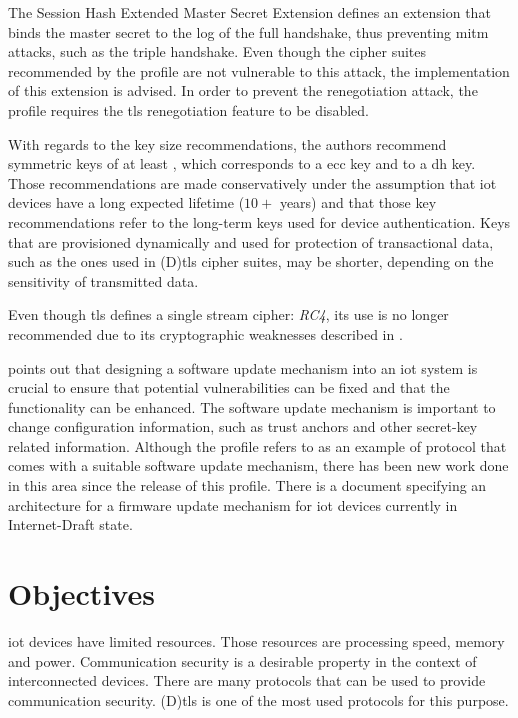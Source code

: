 \documentclass{llncs}
\begin{document}
The Session Hash Extended Master Secret Extension\cite{RFC7627} defines an extension
that binds the master secret to the log of the full handshake, thus preventing
\gls{mitm} attacks, such as the triple handshake\cite{TripleHa89:online}. Even though the
cipher suites recommended by the profile are not vulnerable to this attack, the
implementation of this extension is advised. In order to prevent the renegotiation
attack\cite{RFC5746}, the profile requires the \gls{tls} renegotiation feature
to be disabled.

With regards to the key size recommendations, the authors recommend symmetric keys
of at least , which corresponds to a  \gls{ecc}
key and to a  \gls{dh} key. Those recommendations are made
conservatively under the assumption that \gls{iot} devices have a long expected
lifetime ($10+$ years) and that those key recommendations refer to the long-term
keys used for device authentication. Keys that are provisioned dynamically
and used for protection of transactional data, such as the ones used in
(D)\gls{tls} cipher suites, may be shorter, depending on the sensitivity of
transmitted data.

Even though \gls{tls} defines a single stream cipher: \textit{RC4}, its use is no longer
recommended due to its cryptographic weaknesses described in \cite{RFC7465}.

\cite{RFC7925} points out that designing a software
update mechanism into an \gls{iot} system is crucial to ensure that potential vulnerabilities
can be fixed and that the functionality can be enhanced. The software update mechanism
is important to change configuration information, such as trust anchors and
other secret-key related information. Although the profile refers to \cite{OpenMobi29:online}
as an example of protocol that comes with a suitable software update mechanism,
there has been new work done in this area since the release of this profile.
There is a document specifying an architecture for a firmware update
mechanism for \gls{iot} devices\cite{I-D.moran-suit-architecture} currently in Internet-Draft state.

\section{Objectives}

\gls{iot} devices have limited resources. Those resources are processing speed, memory and power.
Communication security is a desirable property in the context of interconnected devices.
There are many protocols that can be used to provide communication security. (D)\gls{tls} is one
of the most used protocols for this purpose.
\end{document}
